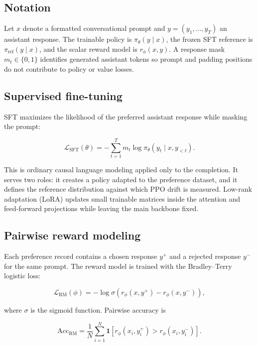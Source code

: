 \documentclass[11pt]{article}
\begin{document}
\subsection{Notation}

Let $x$ denote a formatted conversational prompt and
$y=(y_1,\ldots,y_T)$ an assistant response. The trainable policy is
$\pi_\theta(y\mid x)$, the frozen SFT reference is
$\pi_{\mathrm{ref}}(y\mid x)$, and the scalar reward model is
$r_\phi(x,y)$. A response mask $m_t\in\{0,1\}$ identifies generated assistant
tokens so prompt and padding positions do not contribute to policy or value
losses.

\subsection{Supervised fine-tuning}

SFT maximizes the likelihood of the preferred assistant response while
masking the prompt:

\begin{equation}
\mathcal{L}_{\mathrm{SFT}}(\theta)
=
-\sum_{t=1}^{T} m_t
\log \pi_\theta(y_t\mid x,y_{<t}).
\label{eq:sft}
\end{equation}

This is ordinary causal language modeling applied only to the completion. It
serves two roles: it creates a policy adapted to the preference dataset, and
it defines the reference distribution against which PPO drift is measured.
Low-rank adaptation (LoRA) \cite{hu2022} updates small trainable matrices
inside the attention and feed-forward projections while leaving the main
backbone fixed.

\subsection{Pairwise reward modeling}

Each preference record contains a chosen response $y^+$ and a rejected
response $y^-$ for the same prompt. The reward model is trained with the
Bradley--Terry logistic loss:

\begin{equation}
\mathcal{L}_{\mathrm{RM}}(\phi)
=
-\log \sigma\left(
r_\phi(x,y^+) - r_\phi(x,y^-)
\right),
\label{eq:rm}
\end{equation}

where $\sigma$ is the sigmoid function. Pairwise accuracy is

\begin{equation}
\mathrm{Acc}_{\mathrm{RM}}
=
\frac{1}{N}\sum_{i=1}^{N}
\mathbf{1}
\left[
r_\phi(x_i,y_i^+) > r_\phi(x_i,y_i^-)
\right].
\end{equation}
\end{document}
